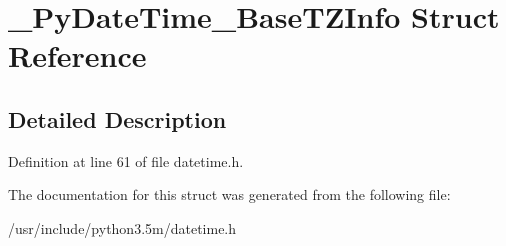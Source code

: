 \hypertarget{struct__PyDateTime__BaseTZInfo}{}\section{\+\_\+\+Py\+Date\+Time\+\_\+\+Base\+T\+Z\+Info Struct Reference}
\label{struct__PyDateTime__BaseTZInfo}


\subsection{Detailed Description}


Definition at line 61 of file datetime.\+h.



The documentation for this struct was generated from the following file\+:\begin{DoxyCompactItemize}
\item 
/usr/include/python3.\+5m/datetime.\+h\end{DoxyCompactItemize}
